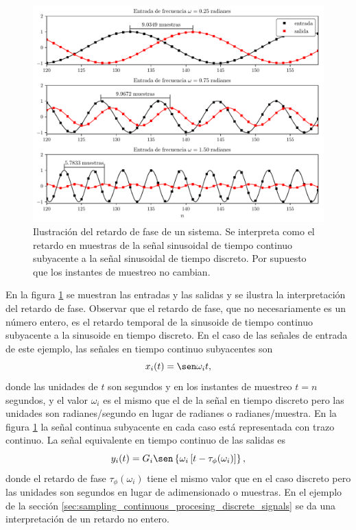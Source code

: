 \documentclass[a4paper]{report}
\begin{document}
\begin{figure}[!htb]
 \begin{center}
 \includegraphics[width=\textwidth]{figuras/seq_and_sys_frequency_response_output_response_phase.pdf}
 \caption{\label{fig:seq_and_sys_frequency_response_output_response_phase} Ilustración del retardo de fase de un sistema. Se interpreta como el retardo en muestras de la señal sinusoidal de tiempo continuo subyacente a la señal sinusoidal de tiempo discreto. Por supuesto que los instantes de muestreo no cambian.}
 \end{center}
\end{figure}
En la figura \ref{fig:seq_and_sys_frequency_response_output_response_phase} se muestran las entradas y las salidas y se ilustra la interpretación del retardo de fase. Observar que el retardo de fase, que no necesariamente es un número entero, es el retardo temporal de la sinusoide de tiempo continuo subyacente a la sinusoide en tiempo discreto. En el caso de las señales de entrada de este ejemplo, las señales en tiempo continuo subyacentes son
\[
 x_i(t)=\sen\omega_it,
\]
donde las unidades de \(t\) son segundos y en los instantes de muestreo \(t=n\) segundos, y el valor \(\omega_i\) es el mismo que el de la señal en tiempo discreto pero las unidades son radianes/segundo en lugar de radianes o radianes/muestra. En la figura \ref{fig:seq_and_sys_frequency_response_output_response_phase} la señal continua subyacente en cada caso está representada con trazo continuo. La señal equivalente en tiempo continuo de las salidas es
\[
 y_i(t)=G_i\sen\left\{\omega_i\left[t-\tau_\phi(\omega_i)\right]\right\},
\]
donde el retardo de fase \(\tau_\phi(\omega_i)\) tiene el mismo valor que en el caso discreto pero las unidades son segundos en lugar de adimensionado o muestras. En el ejemplo de la sección \ref{sec:sampling_continuous_procesing_discrete_signals} se da una interpretación de un retardo no entero. 
\end{document}
